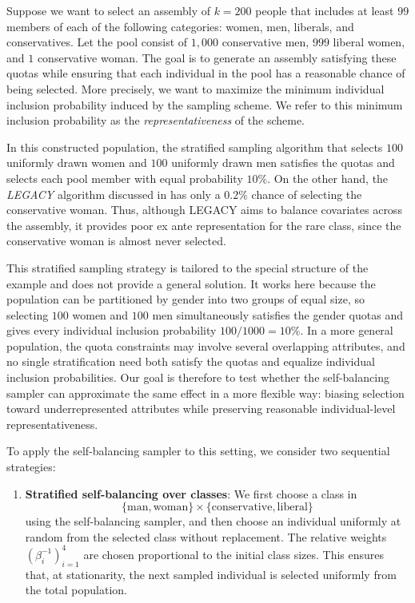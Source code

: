\begin{subappendices}
Suppose we want to select an assembly of $k = 200$ people that includes at least $99$ members of each of the following categories: women, men, liberals, and conservatives. Let the pool consist of $1{,}000$ conservative men, $999$ liberal women, and $1$ conservative woman. The goal is to generate an assembly satisfying these quotas while ensuring that each individual in the pool has a reasonable chance of being selected. More precisely, we want to maximize the minimum individual inclusion probability induced by the sampling scheme. We refer to this minimum inclusion probability as the \textit{representativeness} of the scheme.

In this constructed population, the stratified sampling algorithm that selects $100$ uniformly drawn women and $100$ uniformly drawn men satisfies the quotas and selects each pool member with equal probability $10\%$. On the other hand, the \textit{LEGACY} algorithm discussed in \cite{flanigan2021_fair_algorithms_citizens_assemblies} has only a $0.2\%$ chance of selecting the conservative woman. Thus, although LEGACY aims to balance covariates across the assembly, it provides poor ex ante representation for the rare class, since the conservative woman is almost never selected.

This stratified sampling strategy is tailored to the special structure of the example and does not provide a general solution. It works here because the population can be partitioned by gender into two groups of equal size, so selecting $100$ women and $100$ men simultaneously satisfies the gender quotas and gives every individual inclusion probability $100/1000 = 10\%$. In a more general population, the quota constraints may involve several overlapping attributes, and no single stratification need both satisfy the quotas and equalize individual inclusion probabilities. Our goal is therefore to test whether the self-balancing sampler can approximate the same effect in a more flexible way: biasing selection toward underrepresented attributes while preserving reasonable individual-level representativeness.

To apply the self-balancing sampler to this setting, we consider two sequential strategies:

\begin{enumerate}
    \item \textbf{Stratified self-balancing over classes}: We first choose a class in
    \[
        \{\text{man}, \text{woman}\} \times \{\text{conservative}, \text{liberal}\}
    \]
    using the self-balancing sampler, and then choose an individual uniformly at random 
    from the selected class without replacement. The relative weights $(\beta_i^{-1})_{i=1}^4$ 
    are chosen proportional to the initial class sizes. This ensures that, at stationarity,
    the next sampled individual is selected uniformly from the total population.


\end{enumerate}
\end{subappendices}
